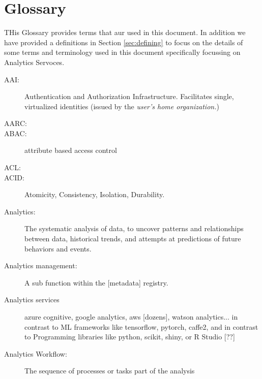 
\section{Glossary}
\label{sec:glossary}

THis Glossary provides terms that aur used in this document. In
addition we have provided a definitions in Section \ref{sec:defining}
to focus on the details of some terms and terminology used in this
document specifically focussing on Analytics Servoces.

\begin{description}

  
\item[AAI:] Authentication and Authorization
  Infrastructure. Facilitates single, virtualized identities (issued
  by the {\em user’s home organization.})

\item[AARC:]     

\item[ABAC:] attribute based access control

\item[ACL:] 

\item[ACID:] Atomicity, Consistency, Isolation, Durability.

\item[Analytics:] The systematic analysis of data, to uncover patterns
  and relationships between data, historical trends, and attempts at
  predictions of future behaviors and events.

\item[Analytics management:] A sub function within the [metadata]
  registry.

\item[Analytics services] azure cognitive, google analytics, aws
  [dozens], watson analytics... in contrast to ML frameworks like
  tensorflow, pytorch, caffe2, and in contrast to Programming
  libraries like python, scikit, shiny, or R Studio [??]


\item[Analytics Workflow:] The sequence of processes or tasks part of
  the analysis


\end{description}

